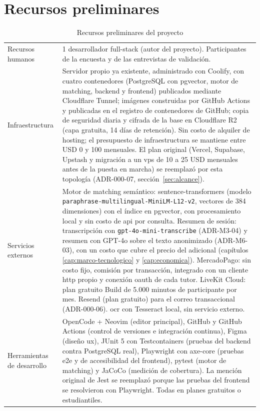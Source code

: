 \section{Recursos preliminares}\label{sec:recursos}

\begin{table}[H]
    \centering
    \caption{Recursos preliminares del proyecto}
    \label{tab:recursos}
    \small
    \begin{tabularx}{\textwidth}{l L}
        \toprule
         &  \\
        \midrule
        Recursos humanos & 1 desarrollador full-stack (autor del proyecto). Participantes de la encuesta y de las entrevistas de validación. \\
        Infraestructura & Servidor propio ya existente, administrado con Coolify, con cuatro contenedores (PostgreSQL con pgvector, motor de \gls{matching}, backend y frontend) publicados mediante Cloudflare Tunnel; imágenes construidas por GitHub Actions y publicadas en el registro de contenedores de GitHub; copia de seguridad diaria y cifrada de la base en Cloudflare R2 (capa gratuita, 14 días de retención). Sin costo de alquiler de hosting; el presupuesto de infraestructura se mantiene entre USD 0 y 100 mensuales. El plan original (Vercel, Supabase, Upstash y migración a un \gls{vps} de 10 a 25 USD mensuales antes de la puesta en marcha) se reemplazó por esta topología (ADR-000-07, sección~\ref{sec:alcance}). \\
        Servicios externos & Motor de \gls{matching} semántico: sentence-transformers (modelo \texttt{paraphrase-multilingual-MiniLM-L12-v2}, vectores de 384 dimensiones) con el índice en pgvector, con procesamiento local y sin costo de \gls{api} por consulta. Resumen de sesión: transcripción con \texttt{gpt-4o-mini-transcribe} (ADR-M3-04) y resumen con GPT-4o sobre el texto anonimizado (ADR-M6-03), con un costo que cubre el precio del adicional (capítulos \ref{cap:marco-tecnologico} y \ref{cap:economica}). MercadoPago: sin costo fijo, comisión por transacción, integrado con un cliente \gls{http} propio y conexión \gls{oauth} de cada tutor. LiveKit Cloud: plan gratuito Build de 5.000 minutos de participante por mes. Resend (plan gratuito) para el correo transaccional (ADR-000-06). \gls{ocr} con Tesseract local, sin servicio externo. \\
        Herramientas de desarrollo & OpenCode + Neovim (editor principal), GitHub y GitHub Actions (control de versiones e integración continua), Figma (diseño \gls{ux}), JUnit 5 con Testcontainers (pruebas del backend contra PostgreSQL real), Playwright con axe-core (pruebas \gls{e2e} y de accesibilidad del frontend), pytest (motor de \gls{matching}) y JaCoCo (medición de cobertura). La mención original de Jest se reemplazó porque las pruebas del frontend se resolvieron con Playwright. Todas en planes gratuitos o estudiantiles. \\

\end{tabularx}
\end{table}
